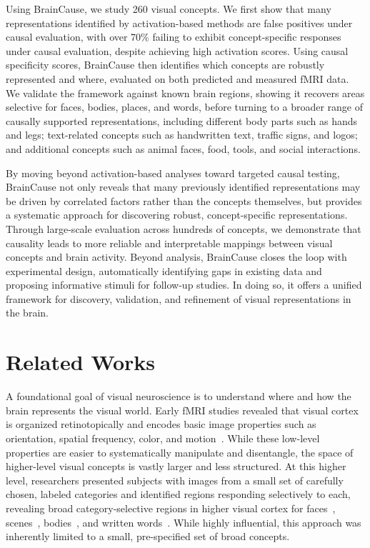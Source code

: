 \documentclass{article}
\begin{document}
Using BrainCause, we study 260 visual concepts. We first show that many representations identified by activation-based methods are false positives under causal evaluation, with over 70\% failing to exhibit concept-specific responses under causal evaluation, despite achieving high activation scores. Using causal specificity scores, BrainCause then identifies which concepts are robustly represented and where, evaluated on both predicted and measured fMRI data. We validate the framework against known brain regions, showing it recovers areas selective for faces, bodies, places, and words, before turning to a broader range of causally supported representations, including different body parts such as hands and legs; text-related concepts such as handwritten text, traffic signs, and logos; and additional concepts such as animal faces, food, tools, and social interactions.


By moving beyond activation-based analyses toward targeted causal testing, BrainCause not only reveals that many previously identified representations may be driven by correlated factors rather than the concepts themselves, but provides a systematic approach for discovering robust, concept-specific representations. Through large-scale evaluation across hundreds of concepts, we demonstrate that causality leads to more reliable and interpretable mappings between visual concepts and brain activity. Beyond analysis, BrainCause closes the loop with experimental design, automatically identifying gaps in existing data and proposing informative stimuli for follow-up studies. In doing so, it offers a unified framework for discovery, validation, and refinement of visual representations in the brain.





\vspace{-0.15cm}
\section{Related Works}
\vspace{-0.15cm}


A foundational goal of visual neuroscience is to understand where and how the brain represents the visual world. Early fMRI studies revealed that visual cortex is organized retinotopically and encodes basic image properties such as orientation, spatial frequency, color, and motion~\cite{Sereno1995Science, Engel1997CerebCortex, DeYoe1996PNAS, Kamitani2005NatNeurosci, Henriksson2008JOV, Conway2007Neuron, Tootell1995Nature}. While these low-level properties are easier to systematically manipulate and disentangle, the space of higher-level visual concepts is vastly larger and less structured. At this higher level, researchers presented subjects with images from a small set of carefully chosen, labeled categories and identified regions responding selectively to each, revealing broad category-selective regions in higher visual cortex for faces~\cite{kanwisher2006fusiform}, scenes~\cite{epstein2019scene}, bodies~\cite{downing2001cortical}, and written words~\cite{cohen2000visual}. While highly influential, this approach was inherently limited to a small, pre-specified set of broad concepts.
\end{document}
